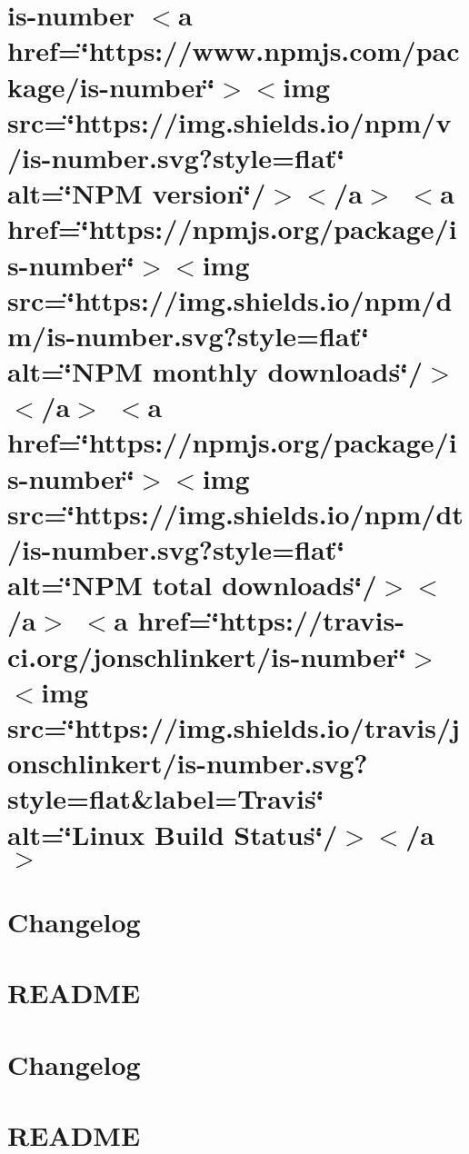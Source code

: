 \let\mypdfximage\pdfximage\def\pdfximage{\immediate\mypdfximage}\documentclass[twoside]{book}
\newcommand{\+}{\discretionary{\mbox{\scriptsize$\hookleftarrow$}}{}{}}
\begin{document}
\chapter{is-\/number $<$a href=\char`\"{}https\+://www.\+npmjs.\+com/package/is-\/number\char`\"{}$>$$<$img src=\char`\"{}https\+://img.\+shields.\+io/npm/v/is-\/number.\+svg?style=flat\char`\"{} alt=\char`\"{}\+N\+P\+M version\char`\"{}/$>$$<$/a$>$ $<$a href=\char`\"{}https\+://npmjs.\+org/package/is-\/number\char`\"{}$>$$<$img src=\char`\"{}https\+://img.\+shields.\+io/npm/dm/is-\/number.\+svg?style=flat\char`\"{} alt=\char`\"{}\+N\+P\+M monthly downloads\char`\"{}/$>$$<$/a$>$ $<$a href=\char`\"{}https\+://npmjs.\+org/package/is-\/number\char`\"{}$>$$<$img src=\char`\"{}https\+://img.\+shields.\+io/npm/dt/is-\/number.\+svg?style=flat\char`\"{} alt=\char`\"{}\+N\+P\+M total downloads\char`\"{}/$>$$<$/a$>$ $<$a href=\char`\"{}https\+://travis-\/ci.\+org/jonschlinkert/is-\/number\char`\"{}$>$$<$img src=\char`\"{}https\+://img.\+shields.\+io/travis/jonschlinkert/is-\/number.\+svg?style=flat\&label=\+Travis\char`\"{} alt=\char`\"{}\+Linux Build Status\char`\"{}/$>$$<$/a$>$}
\label{md_heap-visualizer_node_modules_is-number__r_e_a_d_m_e}

\chapter{Changelog}
\label{md_heap-visualizer_node_modules_is-regex__c_h_a_n_g_e_l_o_g}

\chapter{R\+E\+A\+D\+ME}
\label{md_heap-visualizer_node_modules_is-regex__r_e_a_d_m_e}

\chapter{Changelog}
\label{md_heap-visualizer_node_modules_is-symbol__c_h_a_n_g_e_l_o_g}

\chapter{R\+E\+A\+D\+ME}
\label{md_heap-visualizer_node_modules_is-symbol__r_e_a_d_m_e}

\end{document}
